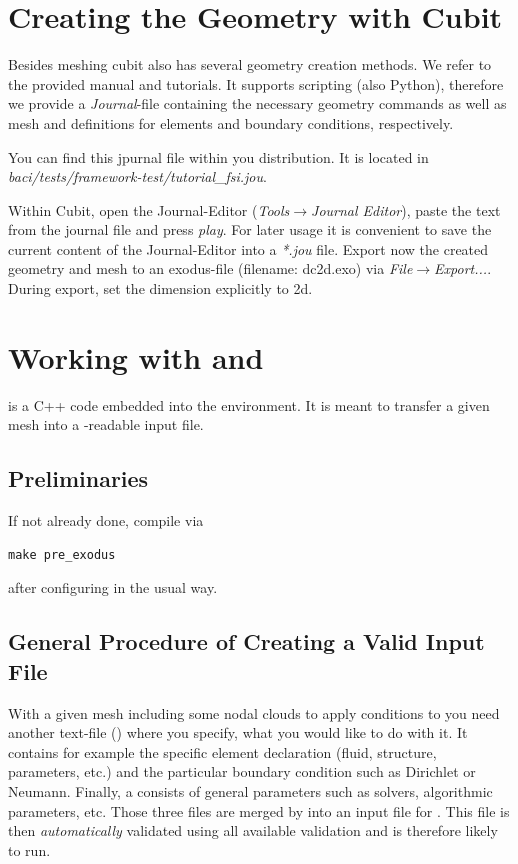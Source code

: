 \section{Creating the Geometry with Cubit}

Besides meshing cubit also has several geometry creation methods. We refer
to the provided manual and tutorials. It supports scripting (also Python),
therefore we provide a \textit{Journal}-file containing the
necessary geometry commands as well as mesh and definitions for elements and
boundary conditions, respectively.

You can find this jpurnal file within you \baci{} distribution. It is located in
\textit{baci/tests/framework-test/tutorial\_fsi.jou}.


Within Cubit, open the Journal-Editor (\emph{Tools}$\to$\emph{Journal
Editor}), paste the text from the journal file and press \emph{play}. For later
usage it is convenient to save the current content of the Journal-Editor into a \emph{*.jou} file. 
Export now the created geometry and mesh to an
exodus-file (filename: dc2d.exo) via \emph{File}$\to$\emph{Export...}. 
During export, set the dimension explicitly to 2d.

\section{Working with \prexo and \baci{}}

\prexo is a C++ code embedded into the \baci{} environment. It is meant to
transfer a given mesh into a \baci{}-readable input file.

\subsection{Preliminaries}

If not already done, compile \prexo via \begin{verbatim}make pre_exodus\end{verbatim} after 
configuring \baci{} in the usual way.

\subsection{General Procedure of Creating a Valid \baci{} Input File}
With a given mesh including some nodal clouds to apply conditions to you need
another text-file (\bc) where you specify, what you would like to do with
it. It contains for example the specific element declaration (fluid, structure,
parameters, etc.) and the particular boundary condition such as Dirichlet or
Neumann. Finally, a \head consists of general parameters such as
solvers, algorithmic parameters, etc. Those three files are merged by \prexo
into an input file for \baci{}. This file is then \emph{automatically} validated
using all available \baci{} validation and is therefore likely to run.

